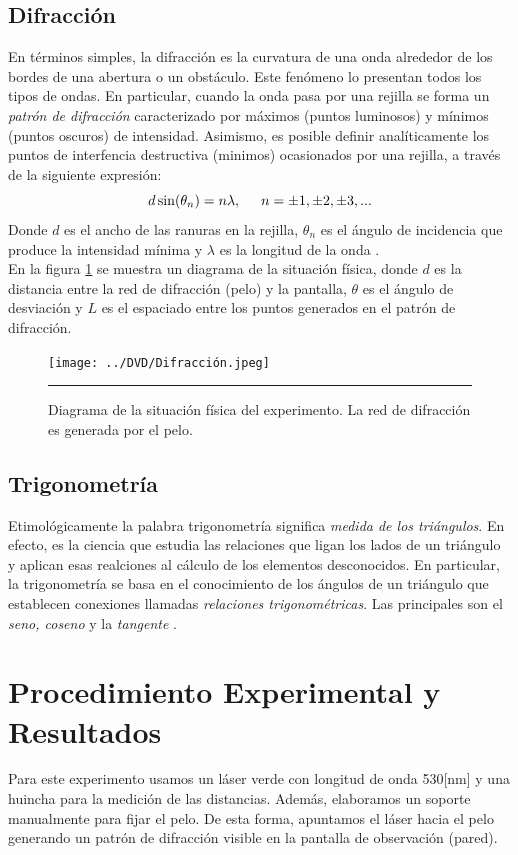 \documentclass[10pt,a4paper]{article}
\begin{document}
\begin{multicols}{2}
		\subsection*{Difracción}
		En términos simples, la difracción es la curvatura de una onda alrededor de los bordes de una abertura o un obstáculo. Este fenómeno lo presentan todos los tipos de ondas. En particular, cuando la onda pasa por una rejilla se forma un \emph{patrón de difracción} caracterizado por máximos (puntos luminosos) y mínimos (puntos oscuros) de intensidad. Asimismo, es posible definir analíticamente los puntos de interfencia destructiva (minimos) ocasionados por una rejilla, a través de la siguiente expresión:
		\begin{equation}\label{minimos de intensidad}
		d \sin(\theta_n) = n \lambda, \hspace{5mm} n = \pm 1, \pm 2, \pm 3,... 
		\end{equation}
		Donde $d$ es el ancho de las ranuras en la rejilla, $\theta_n$ es el ángulo de incidencia que produce la intensidad mínima y $\lambda$ es la longitud de la onda \cite{wikidifrac}. \\
		En la figura \ref{Red de difracción} se muestra un diagrama de la situación física, donde $d$ es la distancia entre la red de difracción (pelo) y la pantalla, $\theta$ es el ángulo de desviación y $L$ es el espaciado entre los puntos generados en el patrón de difracción. 
		
		\begin{figure}[H]
			\centering
			\texttt{[image: ../DVD/Difracción.jpeg]} 
			\caption{Diagrama de la situación física del experimento. La red de difracción es generada por el pelo.}
			\label{Red de difracción}
			\rule{80mm}{0.1mm}
		\end{figure}
		
		\subsection*{Trigonometría}
		Etimológicamente la palabra trigonometría significa \textit{medida de los triángulos}. En efecto, es la ciencia que estudia las relaciones que ligan los lados de un triángulo y aplican esas realciones al cálculo de los elementos desconocidos. En particular, la trigonometría se basa en el conocimiento de los ángulos de un triángulo que establecen conexiones llamadas \textit{relaciones trigonométricas}. Las principales son el \emph{seno, coseno} y la \emph{tangente} \cite{trigonometria}.
		\section{Procedimiento Experimental y Resultados}
		Para este experimento usamos un láser verde con longitud de onda 530[nm] y una huincha para la medición de las distancias. Además, elaboramos un soporte manualmente para fijar el pelo. De esta forma, apuntamos el láser hacia el pelo generando un patrón de difracción visible en la pantalla de observación (pared).\\
		

\end{multicols}
\end{document}
